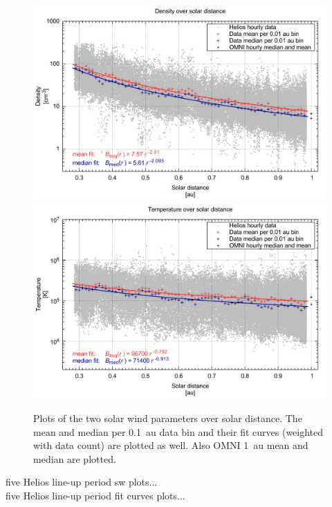 \begin{figure}[p]
	\centering
	\includegraphics[width=1.0\textwidth+4mm]{images/gnuplots/radial_fit_n_thesis_pdfcairo_plot.pdf}
	\includegraphics[width=1.0\textwidth+4mm]{images/gnuplots/radial_fit_T_thesis_pdfcairo_plot.pdf}
	\caption{Plots of the two solar wind parameters over solar distance. The mean and median per 0.1~au data bin and their fit curves (weighted with data count) are plotted as well. Also OMNI 1~au mean and median are plotted.}
	\label{fig:radial_fit_nT_thesis_pdfcairo_plot}
\end{figure}

five Helios line-up period sw plots...\\
five Helios line-up period fit curves plots...\\

